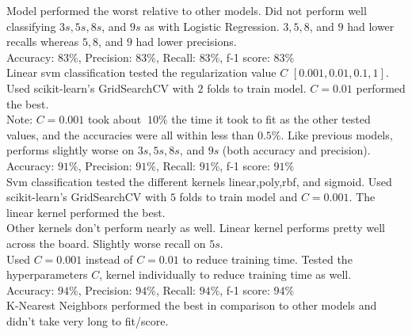 \documentclass[10pt]{article}
\begin{document}
Model performed the worst relative to other models. Did not perform well classifying $3s,5s,8s$, and $9s$ as with Logistic Regression. $3,5,8$, and $9$ had lower recalls whereas $5,8$, and $9$ had lower precisions.\\
Accuracy: $83\%$, Precision: $83\%$, Recall: $83\%$, f-1 score: $83\%$\\
Linear svm classification tested the regularization value $C$ $[0.001,0.01,0.1,1]$. Used scikit-learn's GridSearchCV with $2$ folds to train model. $C=0.01$ performed the best.\\
Note: $C=0.001$ took about $~10\%$ the time it took to fit as the other tested values, and the accuracies were all within less than $0.5\%$.
Like previous models, performs slightly worse on $3s,5s,8s$, and $9s$ (both accuracy and precision).\\
Accuracy: $91\%$, Precision: $91\%$, Recall: $91\%$, f-1 score: $91\%$\\
Svm classification tested the different kernels linear,poly,rbf, and sigmoid. Used scikit-learn's GridSearchCV with $5$ folds to train model and $C=0.001$. The linear kernel performed the best.\\
Other kernels don't perform nearly as well. Linear kernel performs pretty well across the board. Slightly worse recall on $5s$.\\
Used $C=0.001$ instead of $C=0.01$ to reduce training time. Tested the hyperparameters $C$, kernel individually to reduce training time as well.\\
Accuracy: $94\%$, Precision: $94\%$, Recall: $94\%$, f-1 score: $94\%$\\
K-Nearest Neighbors performed the best in comparison to other models and didn't take very long to fit/score.

\end{document}
